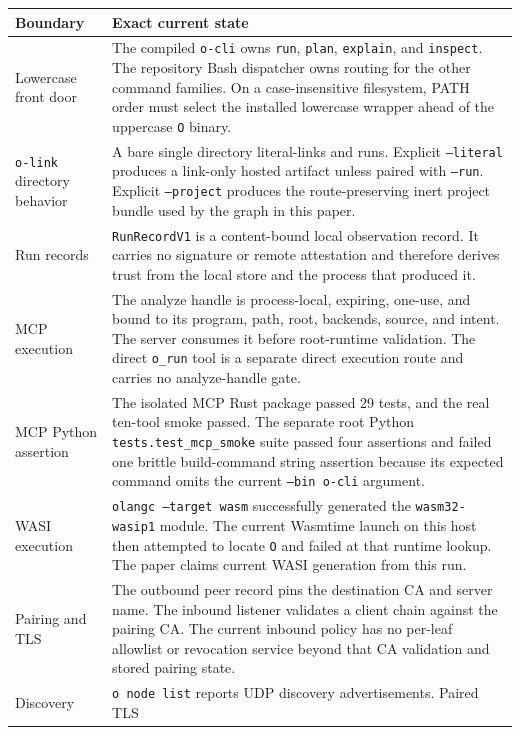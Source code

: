 \documentclass[11pt,oneside]{article}
\begin{document}
\begin{longtable}{P{0.23\textwidth} P{0.69\textwidth}}
\toprule
\textbf{Boundary} & \textbf{Exact current state} \\
\midrule
\endhead
Lowercase front door &
The compiled \texttt{o-cli} owns \texttt{run}, \texttt{plan},
\texttt{explain}, and \texttt{inspect}. The repository Bash dispatcher owns
routing for the other command families. On a case-insensitive filesystem, PATH
order must select the installed lowercase wrapper ahead of the uppercase
\texttt{O} binary. \\
\texttt{o-link} directory behavior &
A bare single directory literal-links and runs. Explicit \texttt{--literal}
produces a link-only hosted artifact unless paired with \texttt{--run}.
Explicit \texttt{--project} produces the route-preserving inert project bundle
used by the graph in this paper. \\
Run records &
\texttt{RunRecordV1} is a content-bound local observation record. It carries no
signature or remote attestation and therefore derives trust from the local
store and the process that produced it. \\
MCP execution &
The analyze handle is process-local, expiring, one-use, and bound to its
program, path, root, backends, source, and intent. The server consumes it before
root-runtime validation. The direct \texttt{o\_run} tool is a separate direct
execution route and carries no analyze-handle gate. \\
MCP Python assertion &
The isolated MCP Rust package passed 29 tests, and the real ten-tool smoke
passed. The separate root Python \texttt{tests.test\_mcp\_smoke} suite passed
four assertions and failed one brittle build-command string assertion because
its expected command omits the current \texttt{--bin o-cli} argument. \\
WASI execution &
\texttt{olangc --target wasm} successfully generated the
\texttt{wasm32-wasip1} module. The current Wasmtime launch on this host then
attempted to locate \texttt{O} and failed at that runtime lookup. The paper
claims current WASI generation from this run. \\
Pairing and TLS &
The outbound peer record pins the destination CA and server name. The inbound
listener validates a client chain against the pairing CA. The current inbound
policy has no per-leaf allowlist or revocation service beyond that CA
validation and stored pairing state. \\
Discovery &
\texttt{o node list} reports UDP discovery advertisements. Paired TLS

\end{longtable}
\end{document}
